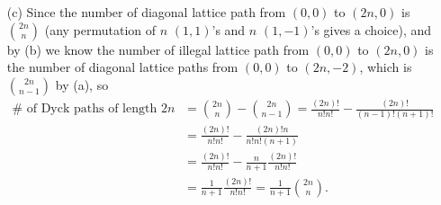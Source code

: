 \documentclass[a4paper,12pt]{article}
\begin{document}
\begin{itemize}
	\item [(c)] Since the number of diagonal lattice path from \((0, 0)\) to \((2n, 0)\) is \(\binom{2n}{n}\) (any permutation of \(n\) \((1, 1)\)'s and \(n\) \((1, -1)\)'s gives a choice), and by (b) we know the number of illegal lattice path from \((0, 0)\) to \((2n, 0)\) is the number of diagonal lattice paths from \((0, 0)\) to \((2n, -2)\), which is \(\binom{2n}{n-1}\) by (a), so 
	\begin{align*}
		\# \text{ of Dyck paths of length } 2n &= \binom{2n}{n} - \binom{2n}{n-1} = \frac{(2n)!}{n!n!} - \frac{(2n)!}{(n-1)!(n+1)!} \\
		&= \frac{(2n)!}{n!n!} - \frac{(2n)!n}{n!n!(n+1)} \\
		&= \frac{(2n)!}{n!n!} - \frac{n}{n+1} \frac{(2n)!}{n!n!} \\
		&= \frac{1}{n+1} \frac{(2n)!}{n!n!} = \frac{1}{n+1} \binom{2n}{n}.
	\end{align*}
\end{itemize}






\end{document}
